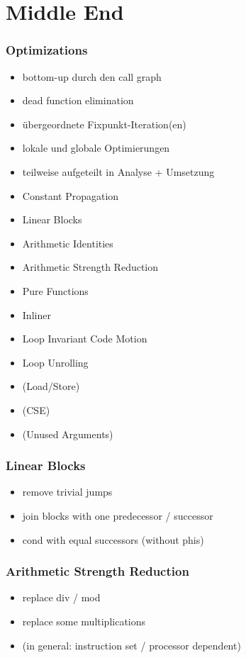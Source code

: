 \documentclass[navbaroff,en]{sdqbeamer}
\begin{document}
\section{Middle End}

\begin{frame}
    \frametitle{Optimizations}

    \begin{itemize}
        \item bottom-up durch den call graph
        \item dead function elimination
        \item übergeordnete Fixpunkt-Iteration(en)
        \item lokale und globale Optimierungen
        \item teilweise aufgeteilt in Analyse + Umsetzung
        \vspace{1em}
        \item Constant Propagation
        \item Linear Blocks
        \item Arithmetic Identities
        \item Arithmetic Strength Reduction
        \item Pure Functions
        \item Inliner
        \item Loop Invariant Code Motion
        \item Loop Unrolling
        \item (Load/Store)
        \item (CSE)
        \item (Unused Arguments)
    \end{itemize}

\end{frame}

\begin{frame}
    \frametitle{Linear Blocks}

    \begin{itemize}
        \item remove trivial jumps
        \item join blocks with one predecessor / successor
        \item cond with equal successors (without phis)
    \end{itemize}

\end{frame}

\begin{frame}
    \frametitle{Arithmetic Strength Reduction}

    \begin{itemize}
        \item replace div / mod
        \item replace some multiplications
        \item (in general: instruction set / processor dependent)
    \end{itemize}

\end{frame}
\end{document}
